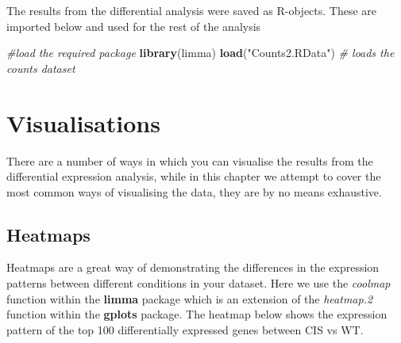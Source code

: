 \documentclass[]{book}
\newenvironment{Shaded}{\begin{snugshade}}{\end{snugshade}}
\newcommand{\CommentTok}[1]{\textcolor[rgb]{0.56,0.35,0.01}{\textit{#1}}}
\newcommand{\DataTypeTok}[1]{\textcolor[rgb]{0.13,0.29,0.53}{#1}}
\newcommand{\DecValTok}[1]{\textcolor[rgb]{0.00,0.00,0.81}{#1}}
\newcommand{\FloatTok}[1]{\textcolor[rgb]{0.00,0.00,0.81}{#1}}
\newcommand{\KeywordTok}[1]{\textcolor[rgb]{0.13,0.29,0.53}{\textbf{#1}}}
\newcommand{\NormalTok}[1]{#1}
\newcommand{\OperatorTok}[1]{\textcolor[rgb]{0.81,0.36,0.00}{\textbf{#1}}}
\newcommand{\StringTok}[1]{\textcolor[rgb]{0.31,0.60,0.02}{#1}}
\begin{document}
The results from the differential analysis were saved as R-objects. These are imported below and used for the rest of the analysis

\begin{Shaded}
\begin{Highlighting}[]
\CommentTok{#load the required package}
\KeywordTok{library}\NormalTok{(limma)}
\KeywordTok{load}\NormalTok{(}\StringTok{"Counts2.RData"}\NormalTok{) }\CommentTok{# loads the counts dataset}
\end{Highlighting}
\end{Shaded}

\hypertarget{visualisations}{%
\section{Visualisations}\label{visualisations}}

There are a number of ways in which you can visualise the results from the differential expression analysis, while in this chapter we attempt to cover the most common ways of visualising the data, they are by no means exhaustive.

\hypertarget{heatmaps}{%
\subsection{Heatmaps}\label{heatmaps}}

Heatmaps are a great way of demonstrating the differences in the expression patterns between different conditions in your dataset. Here we use the \emph{coolmap} function within the \textbf{limma} package which is an extension of the \emph{heatmap.2} function within the \textbf{gplots} package. The heatmap below shows the expression pattern of the top 100 differentially expressed genes between CIS vs WT.

\begin{Shaded}
\end{Shaded}
\end{document}
